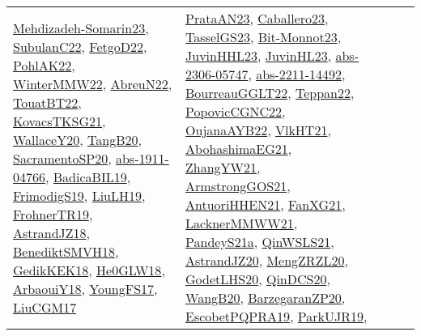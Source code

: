 {\begin{longtable}{lp{3cm}>{\raggedright}p{6cm}>{\raggedright}p{6cm}p{8cm}}
\href{papers/Mehdizadeh-Somarin23.pdf}{Mehdizadeh-Somarin23}\cite{Mehdizadeh-Somarin23}, \href{articles/SubulanC22.pdf}{SubulanC22}\cite{SubulanC22}, \href{articles/FetgoD22.pdf}{FetgoD22}\cite{FetgoD22}, \href{articles/PohlAK22.pdf}{PohlAK22}\cite{PohlAK22}, \href{papers/WinterMMW22.pdf}{WinterMMW22}\cite{WinterMMW22}, \href{articles/AbreuN22.pdf}{AbreuN22}\cite{AbreuN22}, \href{papers/TouatBT22.pdf}{TouatBT22}\cite{TouatBT22}, \href{papers/KovacsTKSG21.pdf}{KovacsTKSG21}\cite{KovacsTKSG21}, \href{articles/WallaceY20.pdf}{WallaceY20}\cite{WallaceY20}, \href{papers/TangB20.pdf}{TangB20}\cite{TangB20}, \href{articles/SacramentoSP20.pdf}{SacramentoSP20}\cite{SacramentoSP20}, \href{articles/abs-1911-04766.pdf}{abs-1911-04766}\cite{abs-1911-04766}, \href{papers/BadicaBIL19.pdf}{BadicaBIL19}\cite{BadicaBIL19}, \href{papers/FrimodigS19.pdf}{FrimodigS19}\cite{FrimodigS19}, \href{papers/LiuLH19.pdf}{LiuLH19}\cite{LiuLH19}, \href{papers/FrohnerTR19.pdf}{FrohnerTR19}\cite{FrohnerTR19}, \href{papers/AstrandJZ18.pdf}{AstrandJZ18}\cite{AstrandJZ18}, \href{papers/BenediktSMVH18.pdf}{BenediktSMVH18}\cite{BenediktSMVH18}, \href{articles/GedikKEK18.pdf}{GedikKEK18}\cite{GedikKEK18}, \href{papers/He0GLW18.pdf}{He0GLW18}\cite{He0GLW18}, \href{papers/ArbaouiY18.pdf}{ArbaouiY18}\cite{ArbaouiY18}, \href{papers/YoungFS17.pdf}{YoungFS17}\cite{YoungFS17}, \href{papers/LiuCGM17.pdf}{LiuCGM17}\cite{LiuCGM17} & \href{articles/PrataAN23.pdf}{PrataAN23}\cite{PrataAN23}, \href{articles/Caballero23.pdf}{Caballero23}\cite{Caballero23}, \href{papers/TasselGS23.pdf}{TasselGS23}\cite{TasselGS23}, \href{papers/Bit-Monnot23.pdf}{Bit-Monnot23}\cite{Bit-Monnot23}, \href{papers/JuvinHHL23.pdf}{JuvinHHL23}\cite{JuvinHHL23}, \href{papers/JuvinHL23.pdf}{JuvinHL23}\cite{JuvinHL23}, \href{articles/abs-2306-05747.pdf}{abs-2306-05747}\cite{abs-2306-05747}, \href{articles/abs-2211-14492.pdf}{abs-2211-14492}\cite{abs-2211-14492}, \href{articles/BourreauGGLT22.pdf}{BourreauGGLT22}\cite{BourreauGGLT22}, \href{papers/Teppan22.pdf}{Teppan22}\cite{Teppan22}, \href{papers/PopovicCGNC22.pdf}{PopovicCGNC22}\cite{PopovicCGNC22}, \href{papers/OujanaAYB22.pdf}{OujanaAYB22}\cite{OujanaAYB22}, \href{articles/VlkHT21.pdf}{VlkHT21}\cite{VlkHT21}, \href{articles/AbohashimaEG21.pdf}{AbohashimaEG21}\cite{AbohashimaEG21}, \href{articles/ZhangYW21.pdf}{ZhangYW21}\cite{ZhangYW21}, \href{papers/ArmstrongGOS21.pdf}{ArmstrongGOS21}\cite{ArmstrongGOS21}, \href{papers/AntuoriHHEN21.pdf}{AntuoriHHEN21}\cite{AntuoriHHEN21}, \href{articles/FanXG21.pdf}{FanXG21}\cite{FanXG21}, \href{papers/LacknerMMWW21.pdf}{LacknerMMWW21}\cite{LacknerMMWW21}, \href{articles/PandeyS21a.pdf}{PandeyS21a}\cite{PandeyS21a}, \href{articles/QinWSLS21.pdf}{QinWSLS21}\cite{QinWSLS21}, \href{articles/AstrandJZ20.pdf}{AstrandJZ20}\cite{AstrandJZ20}, \href{articles/MengZRZL20.pdf}{MengZRZL20}\cite{MengZRZL20}, \href{papers/GodetLHS20.pdf}{GodetLHS20}\cite{GodetLHS20}, \href{articles/QinDCS20.pdf}{QinDCS20}\cite{QinDCS20}, \href{papers/WangB20.pdf}{WangB20}\cite{WangB20}, \href{papers/BarzegaranZP20.pdf}{BarzegaranZP20}\cite{BarzegaranZP20}, \href{articles/EscobetPQPRA19.pdf}{EscobetPQPRA19}\cite{EscobetPQPRA19}, \href{papers/ParkUJR19.pdf}{ParkUJR19}\cite{ParkUJR19}, 
\end{longtable}}
